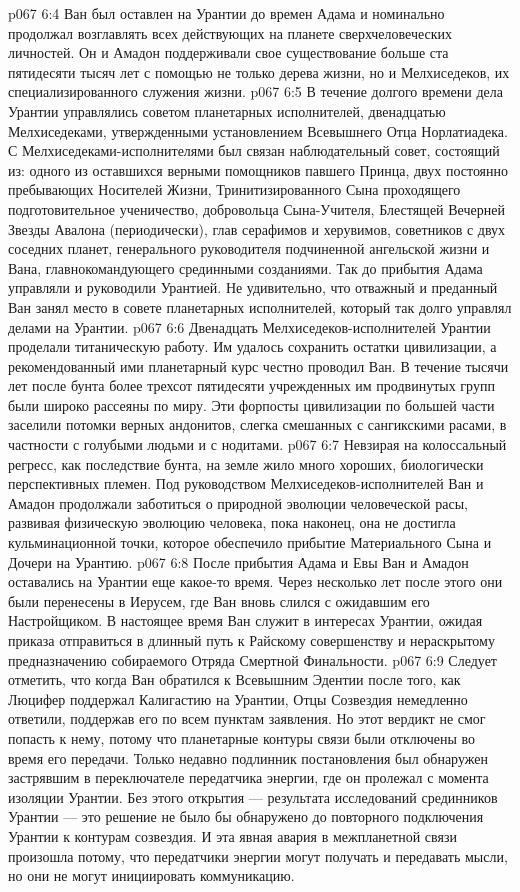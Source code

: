 \vs p067 6:4 Ван был оставлен на Урантии до времен Адама и номинально продолжал возглавлять всех действующих на планете сверхчеловеческих личностей. Он и Амадон поддерживали свое существование больше ста пятидесяти тысяч лет с помощью не только дерева жизни, но и Мелхиседеков, их специализированного служения жизни.
\vs p067 6:5 \pc В течение долгого времени дела Урантии управлялись советом планетарных исполнителей, двенадцатью Мелхиседеками, утвержденными установлением Всевышнего Отца Норлатиадека. С Мелхиседеками\hyp{}исполнителями был связан наблюдательный совет, состоящий из: одного из оставшихся верными помощников павшего Принца, двух постоянно пребывающих Носителей Жизни, Тринитизированного Сына проходящего подготовительное ученичество, добровольца Сына\hyp{}Учителя, Блестящей Вечерней Звезды Авалона (периодически), глав серафимов и херувимов, советников с двух соседних планет, генерального руководителя подчиненной ангельской жизни и Вана, главнокомандующего срединными созданиями. Так до прибытия Адама управляли и руководили Урантией. Не удивительно, что отважный и преданный Ван занял место в совете планетарных исполнителей, который так долго управлял делами на Урантии.
\vs p067 6:6 Двенадцать Мелхиседеков\hyp{}исполнителей Урантии проделали титаническую работу. Им удалось сохранить остатки цивилизации, а рекомендованный ими планетарный курс честно проводил Ван. В течение тысячи лет после бунта более трехсот пятидесяти учрежденных им продвинутых групп были широко рассеяны по миру. Эти форпосты цивилизации по большей части заселили потомки верных андонитов, слегка смешанных с сангикскими расами, в частности с голубыми людьми и с нодитами.
\vs p067 6:7 Невзирая на колоссальный регресс, как последствие бунта, на земле жило много хороших, биологически перспективных племен. Под руководством Мелхиседеков\hyp{}исполнителей Ван и Амадон продолжали заботиться о природной эволюции человеческой расы, развивая физическую эволюцию человека, пока наконец, она не достигла кульминационной точки, которое обеспечило прибытие Материального Сына и Дочери на Урантию.
\vs p067 6:8 \pc После прибытия Адама и Евы Ван и Амадон оставались на Урантии еще какое\hyp{}то время. Через несколько лет после этого они были перенесены в Иерусем, где Ван вновь слился с ожидавшим его Настройщиком. В настоящее время Ван служит в интересах Урантии, ожидая приказа отправиться в длинный путь к Райскому совершенству и нераскрытому предназначению собираемого Отряда Смертной Финальности.
\vs p067 6:9 \pc Следует отметить, что когда Ван обратился к Всевышним Эдентии после того, как Люцифер поддержал Калигастию на Урантии, Отцы Созвездия немедленно ответили, поддержав его по всем пунктам заявления. Но этот вердикт не смог попасть к нему, потому что планетарные контуры связи были отключены во время его передачи. Только недавно подлинник постановления был обнаружен застрявшим в переключателе передатчика энергии, где он пролежал с момента изоляции Урантии. Без этого открытия --- результата исследований срединников Урантии --- это решение не было бы обнаружено до повторного подключения Урантии к контурам созвездия. И эта явная авария в межпланетной связи произошла потому, что передатчики энергии могут получать и передавать мысли, но они не могут инициировать коммуникацию.
